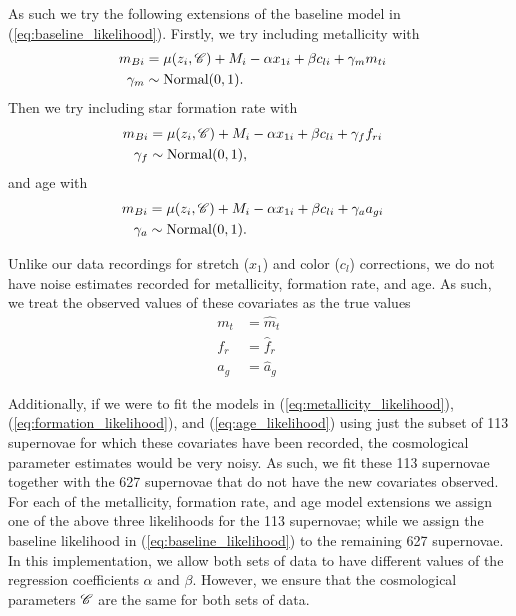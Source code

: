 As such we try the following extensions of the baseline model in (\ref{eq:baseline_likelihood}). Firstly, we try including metallicity with
\begin{align}
m_{Bi} &= \mu(z_i, \mathcal{C}) + M_i - \alpha x_{1i} + \beta c_{li} + \gamma_{m} m_{ti} && \label{eq:metallicity_likelihood} \\\nonumber
\gamma_{m} &\sim \text{Normal}(0, 1).
\end{align}
Then we try including star formation rate with
\begin{align}
m_{Bi} &= \mu(z_i, \mathcal{C}) + M_i - \alpha x_{1i} + \beta c_{li} + \gamma_{f} f_{ri} && \label{eq:formation_likelihood} \\\nonumber
\gamma_{f} &\sim \text{Normal}(0, 1),
\end{align}
and age with
\begin{align}
m_{Bi} &= \mu(z_i, \mathcal{C}) + M_i - \alpha x_{1i} + \beta c_{li} + \gamma_{a} a_{gi} && \label{eq:age_likelihood} \\\nonumber
\gamma_{a} &\sim \text{Normal}(0, 1).
\end{align}

Unlike our data recordings for stretch ($x_1$) and color ($c_l$) corrections, we do not have noise estimates recorded for metallicity, formation rate, and age. As such, we treat the observed values of these covariates as the true values
\begin{align}
m_t &= \hat{m}_t && \\\nonumber
f_r &= \hat{f}_r && \\\nonumber
a_g &= \hat{a}_g
\end{align}

Additionally, if we were to fit the models in (\ref{eq:metallicity_likelihood}), (\ref{eq:formation_likelihood}), and (\ref{eq:age_likelihood}) using just the subset of 113 supernovae for which these covariates have been recorded, the cosmological parameter estimates would be very noisy. As such, we fit these 113 supernovae together with the 627 supernovae that do not have the new covariates observed. For each of the metallicity, formation rate, and age model extensions we assign one of the above three likelihoods for the 113 supernovae; while we assign the baseline likelihood in (\ref{eq:baseline_likelihood}) to the remaining 627 supernovae. In this implementation, we allow both sets of data to have different values of the regression coefficients $\alpha$ and $\beta$. However, we ensure that the cosmological parameters $\mathcal{C}$ are the same for both sets of data.

